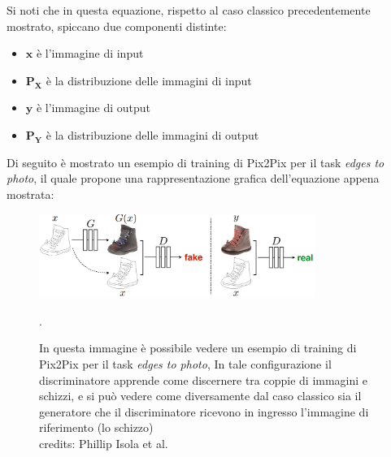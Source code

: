 Si noti che in questa equazione, rispetto al caso classico precedentemente mostrato, spiccano due componenti distinte:
\begin{itemize}
    \item $\mathbf{x}$ è l'immagine di input
    \item $\mathbf{P_X}$ è la distribuzione delle immagini di input
    \item $\mathbf{y}$  è l'immagine di output
    \item $\mathbf{P_Y}$ è la distribuzione delle immagini di output
\end{itemize}

Di seguito è mostrato un esempio di training di Pix2Pix per il task \textit{edges to photo}, il quale propone una rappresentazione grafica
dell'equazione appena mostrata:

    \begin{figure}[H]
        \centering
        \includegraphics[width=0.8\textwidth]{imgs/pix2pix_train.png}
        \caption{In questa immagine è possibile vedere un esempio di training di Pix2Pix per il task \textit{edges to photo},
        In tale configurazione il discriminatore apprende come discernere tra coppie di immagini e schizzi, e si può vedere come diversamente
        dal caso classico sia il generatore che il discriminatore ricevono in ingresso l'immagine di riferimento (lo schizzo)\\
        credits: Phillip Isola et al. \cite{isola2018imagetoimage}}.
        \label{fig:pix2pix}
    \end{figure}


